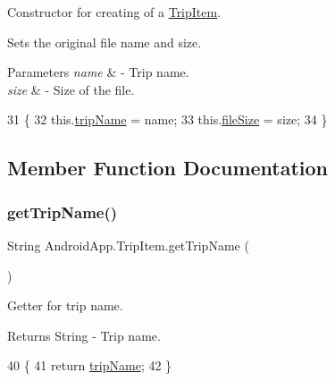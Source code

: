 Constructor for creating of a \hyperlink{class_android_app_1_1_trip_item}{Trip\+Item}. 

Sets the original file name and size.


\begin{DoxyParams}{Parameters}
{\em name} & -\/ Trip name. \\
\hline
{\em size} & -\/ Size of the file. \\
\hline
\end{DoxyParams}

\begin{DoxyCode}
31                                            \{
32         this.\hyperlink{class_android_app_1_1_trip_item_ae5137b0b6077e3fcf293430bc9c488e3}{tripName} = name;
33         this.\hyperlink{class_android_app_1_1_trip_item_a0689a1340427784d8658cc616da310f2}{fileSize} = size;
34     \}
\end{DoxyCode}


\subsection{Member Function Documentation}
\mbox{\label{class_android_app_1_1_trip_item_ae7d202ccb169b225ed3c7f5b6b0fb9eb}} 
\subsubsection{\texorpdfstring{get\+Trip\+Name()}{getTripName()}}
{\footnotesize\ttfamily String Android\+App.\+Trip\+Item.\+get\+Trip\+Name (\begin{DoxyParamCaption}{ }\end{DoxyParamCaption})\hspace{0.3cm}{\ttfamily [inline]}}



Getter for trip name. 

\begin{DoxyReturn}{Returns}
String -\/ Trip name. 
\end{DoxyReturn}

\begin{DoxyCode}
40                                 \{
41         \textcolor{keywordflow}{return} \hyperlink{class_android_app_1_1_trip_item_ae5137b0b6077e3fcf293430bc9c488e3}{tripName};
42     \}
\end{DoxyCode}
\mbox{\label{class_android_app_1_1_trip_item_a6c1705dd48325abf0a0abbda977df903}} 
